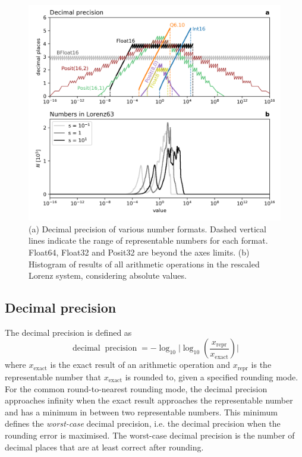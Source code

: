 \documentclass[draft]{agujournal2019}
\newcommand{\op}{\operatorname}
\begin{document}
\begin{figure}[htbp]
\includegraphics[width=1\textwidth]{../plots/decimal_precision.png}
\caption{(a) Decimal precision of various number formats. Dashed vertical lines indicate the range of representable numbers for each format. Float64, Float32 and Posit32 are beyond the axes limits. (b) Histogram of results of all arithmetic operations in the rescaled Lorenz system, considering absolute values.}
\label{fig:dec_acc}
\end{figure}

\subsection{Decimal precision}
\label{sec:decprec}

The decimal precision is defined as \cite{Gustafson2017,Gustafson2017a}
\begin{equation}
\op{decimal} \op{precision} = -\log_{10} \vert \log_{10}( \frac{x_\text{repr}}{x_\text{exact}} ) \vert
\end{equation}
where $x_\text{exact}$ is the exact result of an arithmetic operation and $x_\text{repr}$ is the representable number that $x_\text{exact}$ is rounded to, given a specified rounding mode. For the common round-to-nearest rounding mode, the decimal precision approaches infinity when the exact result approaches the representable number and has a minimum in between two representable numbers. This minimum defines the \emph{worst-case} decimal precision, i.e. the decimal precision when the rounding error is maximised. The worst-case decimal precision is the number of decimal places that are at least correct after rounding. 
\end{document}
